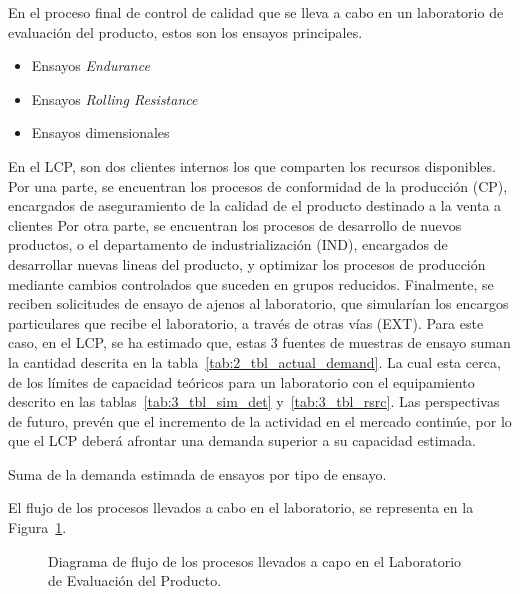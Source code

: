 En el proceso final de control de calidad
que se lleva a cabo en un laboratorio de evaluación del producto,
estos son los ensayos principales.

\begin{itemize}
	\item Ensayos \textit{Endurance}
	\item Ensayos \textit{Rolling Resistance}
	\item Ensayos dimensionales
\end{itemize}

En el LCP,
son dos clientes internos los que comparten los recursos disponibles.
Por una parte, se encuentran los procesos de conformidad de la producción (CP),
encargados de aseguramiento de la calidad
de el producto destinado a la venta a clientes
Por otra parte, se encuentran los procesos de desarrollo de nuevos productos,
o el departamento de industrialización (IND),
encargados de desarrollar nuevas lineas del producto,
y optimizar los procesos de producción
mediante cambios controlados que suceden en grupos reducidos.
Finalmente, se reciben solicitudes de ensayo de ajenos al laboratorio,
que simularían los encargos particulares que recibe el laboratorio,
a través de otras vías (EXT).
Para este caso, en el LCP, se ha estimado que,
estas 3 fuentes de muestras de ensayo
suman la cantidad descrita en la tabla~\ref{tab:2_tbl_actual_demand}.
La cual esta cerca, de los límites de capacidad teóricos
para un laboratorio con el equipamiento descrito en
las tablas~\ref{tab:3_tbl_sim_det} y~\ref{tab:3_tbl_rsrc}.
Las perspectivas de futuro, prevén que el incremento
de la actividad en el mercado continúe,
por lo que el LCP deberá afrontar una demanda superior a su capacidad estimada.

\begin{table}
	\centering
	\caption{Suma de la demanda estimada de ensayos por tipo de ensayo.}
	
	\label{tab:2_tbl_actual_demand}
\end{table}

El flujo de los procesos llevados a cabo en el laboratorio,
se representa en la Figura~\ref{fig:2_fc_lep_diagram}.

\begin{figure}
	\begin{center}
		
	\end{center}
	\caption{Diagrama de flujo de los procesos llevados a capo en el Laboratorio de Evaluación del Producto.}
	\label{fig:2_fc_lep_diagram}
\end{figure}

